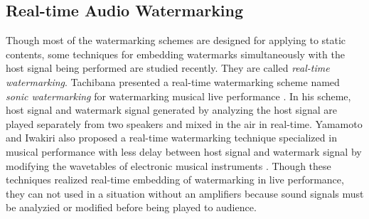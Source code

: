 \subsection{Real-time Audio Watermarking}
Though most of the watermarking schemes are designed for applying to static contents, some techniques for embedding watermarks simultaneously with the host signal being performed are studied recently. They are called {\it real-time watermarking}.
Tachibana presented a real-time watermarking scheme named {\it sonic watermarking} for watermarking musical live performance \cite{tachibana2003audio}. In his scheme, host signal and watermark signal generated by analyzing the host signal are played separately from two speakers and mixed in the air in real-time.
Yamamoto and Iwakiri also proposed a real-time watermarking technique specialized in musical performance with less delay between host signal and watermark signal by modifying the wavetables of electronic musical instruments \cite{yamamoto2010real}.
Though these techniques realized real-time embedding of watermarking in live performance, they can not used in a situation without an amplifiers because sound signals must be analyzied or modified before being played to audience.
